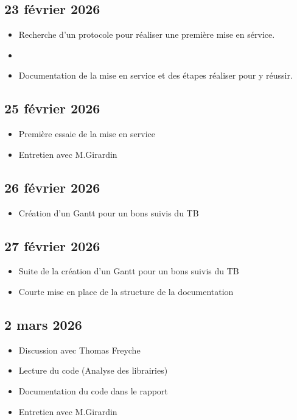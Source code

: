 \subsection*{23 février 2026}

\begin{itemize}
    \item Recherche d'un protocole pour réaliser une première mise en sérvice.
    \item \item Documentation de la mise en service et des étapes réaliser pour y réussir.
\end{itemize}

\subsection*{25 février 2026}

\begin{itemize}
    \item Première essaie de la mise en service
    \item Entretien avec M.Girardin
\end{itemize}

\subsection*{26 février 2026}

\begin{itemize}
    \item Création d'un Gantt pour un bons suivis du TB
\end{itemize}

\subsection*{27 février 2026}

\begin{itemize}
    \item Suite de la création d'un Gantt pour un bons suivis du TB
    \item Courte mise en place de la structure de la documentation
\end{itemize}

\subsection*{2 mars 2026}
\begin{itemize}
    \item Discussion avec Thomas Freyche
    \item Lecture du code (Analyse des librairies)
    \item Documentation du code dans le rapport
    \item Entretien avec M.Girardin
\end{itemize}

